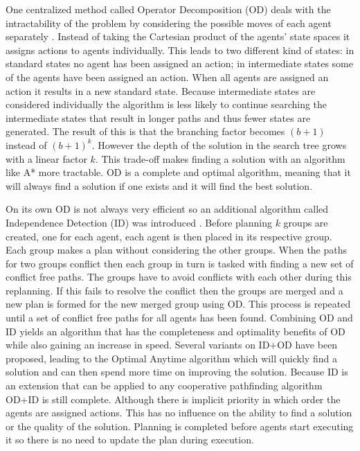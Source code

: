 One centralized method called Operator Decomposition (OD) deals with the
intractability of the problem by considering the possible moves of each agent
separately \cite{standley2010,standley2011}. Instead of taking the Cartesian
product of
the agents' state spaces it assigns actions to agents individually. This leads
to two different kind of states: in standard states no agent has been assigned
an action; in intermediate states some of the agents have been assigned an
action. When all agents are assigned an action it results in a new standard
state. Because intermediate states are considered individually the algorithm is
less likely to continue searching the intermediate states that result in longer
paths and thus
fewer states are generated. The result of this is that the branching factor
becomes $(b+1)$ instead of $(b+1)^k$. However the depth of the solution in the
search tree grows with a linear factor $k$. This trade-off makes finding a
solution with an algorithm like
A* more tractable. OD is a complete and optimal algorithm, meaning that it will
always find a solution if one exists and it will find the best solution.

On its own OD is not always very efficient so an additional algorithm called
Independence Detection (ID) was introduced \cite{standley2010}. Before planning
$k$ groups are created, one for each agent, each agent is then placed in its
respective group. Each group makes a plan without considering the other groups.
When the paths for two groups conflict then each group in turn is tasked with
finding a new set of conflict free paths. The groups have to avoid conflicts
with each other during this replanning. If this fails to resolve the conflict
then the groups are merged and a new plan is formed for the new merged group
using OD. This process is repeated until a set of conflict free paths for all
agents has been found. Combining OD and ID yields an algorithm that has the
completeness and optimality benefits of OD while also gaining an increase in
speed. Several variants on
ID+OD have been proposed, leading to the Optimal Anytime algorithm
\cite{standley2011} which will quickly find a solution and can then spend more
time on improving the solution. Because ID is an extension that can be applied
to any cooperative pathfinding algorithm OD+ID is still complete. Although
there is implicit priority in which order the agents are assigned actions. This
has no influence on the ability to find a solution or the quality of the
solution. Planning is completed before agents start executing it so there is
no need to update the plan during execution.

